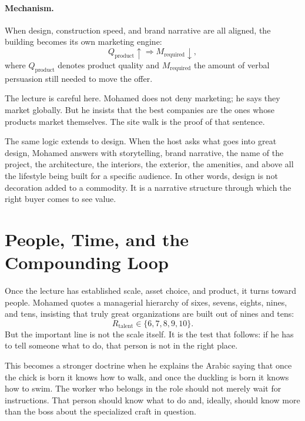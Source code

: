 \paragraph{Mechanism.} When design, construction speed, and brand narrative are all aligned, the building becomes its own marketing engine:
\begin{equation}
Q_{\text{product}} \uparrow
\Longrightarrow
M_{\text{required}} \downarrow,
\end{equation}
where \(Q_{\text{product}}\) denotes product quality and \(M_{\text{required}}\) the amount of verbal persuasion still needed to move the offer.

The lecture is careful here. Mohamed does not deny marketing; he says they market globally. But he insists that the best companies are the ones whose products market themselves. The site walk is the proof of that sentence.

The same logic extends to design. When the host asks what goes into great design, Mohamed answers with storytelling, brand narrative, the name of the project, the architecture, the interiors, the exterior, the amenities, and above all the lifestyle being built for a specific audience. In other words, design is not decoration added to a commodity. It is a narrative structure through which the right buyer comes to see value.

\section{People, Time, and the Compounding Loop}

Once the lecture has established scale, asset choice, and product, it turns toward people. Mohamed quotes a managerial hierarchy of sixes, sevens, eights, nines, and tens, insisting that truly great organizations are built out of nines and tens:
\begin{equation}
R_{\text{talent}} \in \{6,7,8,9,10\}.
\end{equation}
But the important line is not the scale itself. It is the test that follows: if he has to tell someone what to do, that person is not in the right place.

This becomes a stronger doctrine when he explains the Arabic saying that once the chick is born it knows how to walk, and once the duckling is born it knows how to swim. The worker who belongs in the role should not merely wait for instructions. That person should know what to do and, ideally, should know more than the boss about the specialized craft in question.

